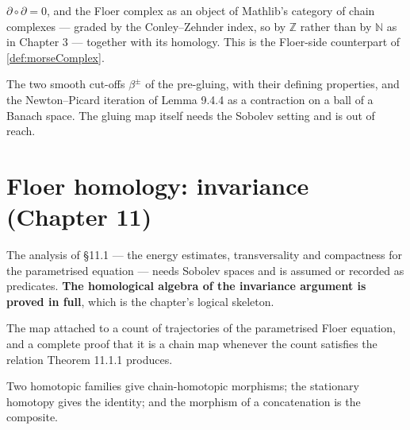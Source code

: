 \begin{theorem}
  \label{thm:9.2.2}
  \leanok
  $\partial\circ\partial = 0$, and the Floer complex as an object of Mathlib's
  category of chain complexes --- graded by the Conley--Zehnder index, so by
  $\mathbb{Z}$ rather than by $\mathbb{N}$ as in Chapter 3 --- together with its
  homology.  This is the Floer-side counterpart of \ref{def:morseComplex}.
\end{theorem}

\begin{lemma}
  \label{lem:9.4.4}
  \leanok
  The two smooth cut-offs $\beta^\pm$ of the pre-gluing, with their defining
  properties, and the Newton--Picard iteration of Lemma 9.4.4 as a contraction
  on a ball of a Banach space.  The gluing map itself needs the Sobolev setting
  and is out of reach.
\end{lemma}

\chapter{Floer homology: invariance (Chapter 11)}

The analysis of \S11.1 --- the energy estimates, transversality and compactness
for the parametrised equation --- needs Sobolev spaces and is assumed or
recorded as predicates.  \textbf{The homological algebra of the invariance
argument is proved in full}, which is the chapter's logical skeleton.

\begin{definition}
  \label{def:11.1.a}
  \leanok
  The map attached to a count of trajectories of the parametrised Floer
  equation, and a complete proof that it is a chain map whenever the count
  satisfies the relation Theorem 11.1.1 produces.
\end{definition}

\begin{proposition}
  \label{prop:11.2.8}
  \leanok
  Two homotopic families give chain-homotopic morphisms; the stationary homotopy
  gives the identity; and the morphism of a concatenation is the composite.
\end{proposition}

